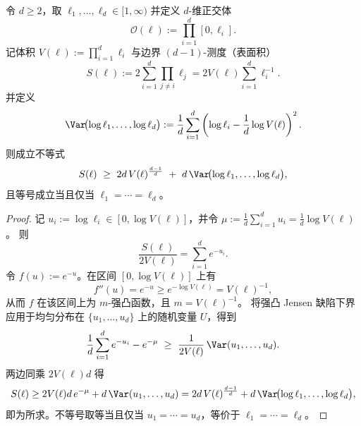 \begin{theorem}\label{thm:pom-orthotope-surface-volume-variance}
令 \(d\ge 2\)，取 \(\ell_1,\dots,\ell_d\in[1,\infty)\) 并定义 \(d\)-维正交体
\[
\mathcal O(\ell):=\prod_{i=1}^{d}[0,\ell_i].
\]
记体积 \(V(\ell):=\prod_{i=1}^{d}\ell_i\) 与边界 \((d-1)\)-测度（表面积）
\[
S(\ell):=2\sum_{i=1}^{d}\prod_{j\ne i}\ell_j
=2V(\ell)\sum_{i=1}^{d}\ell_i^{-1}.
\]
并定义
\[
\Var\!\bigl(\log\ell_1,\dots,\log\ell_d\bigr)
:=\frac1d\sum_{i=1}^{d}\left(\log\ell_i-\frac1d\log V(\ell)\right)^2.
\]
则成立不等式
\[
S(\ell)\ \ge\ 2d\,V(\ell)^{\frac{d-1}{d}}
\ +\ d\,\Var\!\bigl(\log\ell_1,\dots,\log\ell_d\bigr),
\]
且等号成立当且仅当 \(\ell_1=\cdots=\ell_d\)。
\end{theorem}
\begin{proof}
记 \(u_i:=\log\ell_i\in[0,\log V(\ell)]\)，并令 \(\mu:=\frac1d\sum_{i=1}^{d}u_i=\frac1d\log V(\ell)\)。
则
\[
\frac{S(\ell)}{2V(\ell)}=\sum_{i=1}^{d}e^{-u_i}.
\]
令 \(f(u):=e^{-u}\)。在区间 \([0,\log V(\ell)]\) 上有
\[
f''(u)=e^{-u}\ge e^{-\log V(\ell)}=V(\ell)^{-1},
\]
从而 \(f\) 在该区间上为 \(m\)-强凸函数，且 \(m=V(\ell)^{-1}\)。
将强凸 Jensen 缺陷下界应用于均匀分布在 \(\{u_1,\dots,u_d\}\) 上的随机变量 \(U\)，得到
\[
\frac1d\sum_{i=1}^{d}e^{-u_i}-e^{-\mu}\ \ge\ \frac{1}{2V(\ell)}\,\Var(u_1,\dots,u_d).
\]
两边同乘 \(2V(\ell)d\) 得
\[
S(\ell)\ge 2V(\ell)d\,e^{-\mu}+d\,\Var(u_1,\dots,u_d)
=2d\,V(\ell)^{\frac{d-1}{d}}+d\,\Var\!\bigl(\log\ell_1,\dots,\log\ell_d\bigr),
\]
即为所求。不等号取等当且仅当 \(u_1=\cdots=u_d\)，等价于 \(\ell_1=\cdots=\ell_d\)。
\end{proof}

